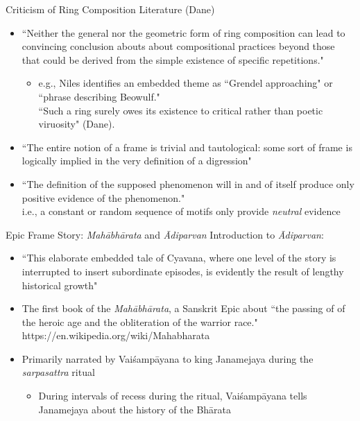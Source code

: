 \documentclass[aspectratio=169]{beamer}
\begin{document}
\begin{frame}{Criticism of Ring Composition Literature (Dane)}
  \begin{itemize}
    \item ``Neither the general nor the geometric form of ring composition can lead to convincing conclusion abouts about compositional practices beyond those that could be derived from the simple existence of specific repetitions." 
      \begin{itemize}
        \item e.g., Niles identifies an embedded theme as ``Grendel approaching" or ``phrase describing Beowulf." \\ 
          ``Such a ring surely owes its existence to critical rather than poetic viruosity" (Dane). 
      \end{itemize} 
    \item ``The entire notion of a frame is trivial and tautological: some sort of frame is logically implied in the very definition of a digression"
    \item ``The definition of the supposed phenomenon will in and of itself produce only positive evidence of the phenomenon." \\
      i.e., a constant or random sequence of motifs only provide \textit{neutral} evidence 
  \end{itemize}
\end{frame}

\newcommand{\mah}{\textit{Mah\={a}bh\={a}rata}\xspace}
\newcommand{\adi}{\textit{\={A}diparvan}\xspace}
\newcommand{\vai}{Vai\'{s}amp\={a}yana\xspace}
\newcommand{\jan}{Janamejaya\xspace}
\newcommand{\sarp}{\textit{sarpasattra}\xspace}
\begin{frame}{Epic Frame Story: \mah and \adi}
  Introduction to \adi: 
  \begin{itemize}
    \item ``This elaborate embedded tale of Cyavana, where one level of the story is interrupted to insert subordinate episodes, is evidently the result of lengthy historical growth"
    \item The first book of the \mah, a Sanskrit Epic about ``the passing of of the heroic age and the obliteration of the warrior race." 
      \\https://en.wikipedia.org/wiki/Mahabharata
    \item Primarily narrated by \vai to king \jan during the \sarp ritual  
      \begin{itemize}
        \item During intervals of recess during the ritual, \vai tells \jan about the history of the Bh\={a}rata 
      \end{itemize}
  \end{itemize}
\end{frame}
\end{document}
